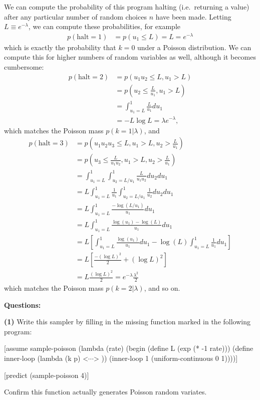 \documentclass[11pt,reqno]{amsart}
\newcommand{\+}[1]{\ensuremath{{\mathbf{#1}}}}
\begin{document}
We can compute the probability of this program halting (i.e.~returning a value) after any particular number of random choices $n$ have been made.
Letting $L \equiv e^{-\lambda}$, we can compute these probabilities, for example
\begin{align}
p(\mathrm{halt}=1) &= p(u_1 \le L) = L = e^{-\lambda}
\end{align}
which is exactly the probability that $k = 0$ under a Poisson distribution.
We can compute this for higher numbers of random variables as well, although it becomes cumbersome:
\begin{align}
p(\mathrm{halt}=2) &= p(u_1u_2 \le L, u_1 > L) \\
&=  p(u_2 \le \frac{L}{u_1}, u_1> L) \\
&= \int_{u_1=L}^1 \frac{L}{u_1} du_1 \\
&= -L \log L = \lambda e^{-\lambda},
\end{align}
which matches the Poisson mass $p(k=1|\lambda)$, and
\begin{align}
p(\mathrm{halt}=3) &= p(u_1u_2u_3 \le L, u_1 > L, u_2 > \frac{L}{u_1}) \\
&=  p(u_3 \le \frac{L}{u_1u_2}, u_1> L, u_2>\frac{L}{u_1}) \\
&= \int_{u_1=L}^1 \int_{u_2=L/u_1}^1 \frac{L}{u_1u_2} du_2du_1 \\
&= L \int_{u_1=L}^1 \frac{1}{u_1} \int_{u_2=L/u_1}^1 \frac{1}{u_2} du_2du_1 \\
&= L \int_{u_1=L}^1 \frac{-\log (L/u_1)}{u_1} du_1 \\
&= L \int_{u_1=L}^1 \frac{\log(u_1) - \log(L)}{u_1} du_1 \\
&= L \left [ \int_{u_1=L}^1 \frac{\log(u_1)}{u_1} du_1 - \log(L) \int_{u_1=L}^1 \frac{1}{u_1} du_1 \right ] \\
&= L \left [\frac{-(\log L)^2}{2} + (\log L)^2 \right ] \\
&= L \frac{(\log L)^2}{2} = e^{-\lambda} \frac{\lambda^2}{2}
\end{align}
which matches the Poisson mass $p(k=2|\lambda)$, and so on.

\pagebreak
{\bf Questions:}

{\bf (1)} Write this sampler by filling in the missing function marked \inline{<$\cdots$>} in the following program:
\begin{code}{}{}
[assume sample-poisson (lambda (rate) (begin
    (define L (exp (* -1 rate)))
    (define inner-loop (lambda (k p)
    	<$\cdots$>
    ))
    (inner-loop 1 (uniform-continuous 0 1))))]
    
[predict (sample-poisson 4)]
\end{code}
Confirm this function actually generates Poisson random variates.
\end{document}
